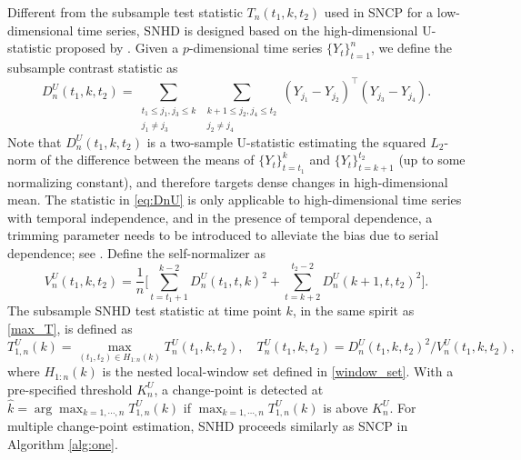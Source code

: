 Different from the subsample test statistic $T_n(t_1,k,t_2)$ used in SNCP for a low-dimensional time series, SNHD is designed based on the high-dimensional U-statistic proposed by \cite{wang2022inference}. Given a $p$-dimensional time series $\{Y_t\}_{t=1}^n$, we define the subsample contrast statistic as 
\begin{equation}\label{eq:DnU}
	D_{n}^{U}(t_1,k,t_2)=\sum_{\substack{t_1\leq j_1,j_3\leq k \\ j_1\neq j_3}} \sum_{\substack{k+1\leq j_2,j_4\leq t_2 \\ j_2\neq j_4}} (Y_{j_1}-Y_{j_2})^{\top}(Y_{j_3}-Y_{j_4}).
\end{equation}
Note that $D_{n}^{U}(t_1,k,t_2)$ is a two-sample U-statistic estimating the squared $L_2$-norm of the difference between the means  of $\{Y_t\}_{t=t_1}^k$ and $\{Y_t\}_{t=k+1}^{t_2}$ (up to some normalizing constant), { and therefore targets dense changes in high-dimensional mean.} The statistic in \eqref{eq:DnU} is only applicable to high-dimensional time series with temporal independence, and in the presence of temporal dependence, a trimming parameter needs to be introduced to alleviate the bias due to serial dependence; see \cite{wang2022inference}.  
Define the self-normalizer as 
\begin{equation}
	V_{n}^{U}(t_1,k,t_2)=\frac{1}{n}\Big[ \sum_{t=t_1+1}^{k-2} D_{n}^{U}(t_1,t,k)^2+\sum_{t=k+2}^{t_2-2}D_{n}^{U}(k+1,t,t_2)^2 \Big].
\end{equation}
The subsample SNHD test statistic at time point $k$, in the same spirit as \eqref{max_T}, is defined  as 
\begin{equation}
	T_{1,n}^{U}(k)=\max_{(t_1,t_2)\in H_{1:n}(k)}T_{n}^{U}(t_1,k,t_2),\quad  T_{n}^{U}(t_1,k,t_2)=D_{n}^{U}(t_1,k,t_2)^2/V_{n}^{U}(t_1,k,t_2),
\end{equation}
where $H_{1:n}(k)$ is the nested local-window set defined in \eqref{window_set}. 
With a pre-specified threshold $K_n^{U}$, a change-point is detected at $\hat{k}=\arg\max_{k=1,\cdots,n}T_{1,n}^U(k)$ if  $\max_{k=1,\cdots,n}T_{1,n}^{U}(k)$ is above $K_n^U$. For multiple change-point  estimation, SNHD proceeds similarly as SNCP  in Algorithm \ref{alg:one}. 

